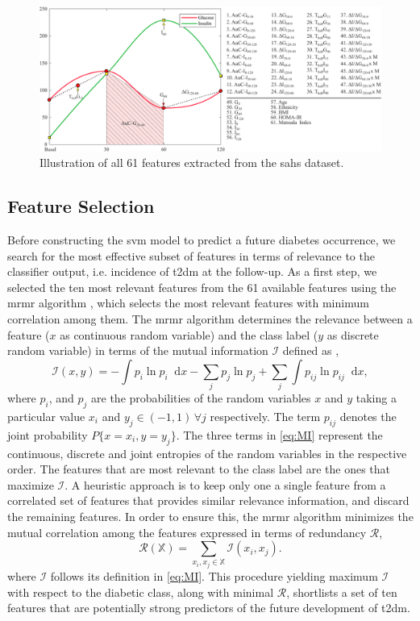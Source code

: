 \documentclass[journal,comsoc]{IEEEtran}
\renewcommand{\^}{\hat}  %
\newcommand*\diff{\mathop{}\!\mathrm{d}} %
\begin{document}
\begin{figure}[t!]
  \centering
  \includegraphics[width=.9\linewidth]{features_define_text.pdf}
  \caption{Illustration of all 61 features extracted from the \ac{sahs} dataset.}
  \label{fig:features}
\end{figure}
%
%
%
%
\subsection{Feature Selection}
%
Before constructing the \ac{svm} model to predict a future diabetes occurrence, we search for the most effective subset of features in terms of relevance to the classifier output, i.e. incidence of \ac{t2dm} at the follow-up. As a first step, we selected the ten most relevant features from the \num{61} available features using the \ac{mrmr} algorithm \cite{mRMR}, which selects the most relevant features with minimum correlation among them. The \ac{mrmr} algorithm determines the relevance between a feature ($x$ as continuous random variable) and the class label ($y$ as discrete random variable) in terms of the mutual information $\mathcal I$ defined as \cite{ross2014mutual},
%
\begin{equation}
  \mathcal I(x, y) = - \int p_i \ln p_i \diff x - \sum \limits_j p_j\ln p_j + \sum_j \int p_{ij}\ln p_{ij} \diff x,
  \label{eq:MI}
\end{equation}
%
where $p_{i}$, and $p_{j}$ are the probabilities of the random variables $x$ and $y$ taking a particular value $x_i$ and $y_j \in (-1,1) \, \forall j$ respectively. The term $p_{ij}$ denotes the joint probability $P\{x= x_i, y=y_j\}$. The three terms in \eqref{eq:MI} represent the continuous, discrete and joint entropies of the random variables in the respective order. The features that are most relevant to the class label are the ones that maximize $\mathcal I$. A heuristic approach is to keep only one a single feature from a correlated set of features that provides similar relevance information, and discard the remaining features. In order to ensure this, the \ac{mrmr} algorithm minimizes the mutual correlation among the features expressed in terms of redundancy $\mathcal R$,
%
\begin{equation}
  \mathcal R(\mathbb X) = \sum \limits_{x_i, x_j \in \mathbb{X}} \mathcal {I}(x_i, x_j).
  \label{eq:R}
\end{equation}
%
where $\mathcal I$ follows its definition in \eqref{eq:MI}. This procedure yielding maximum $\mathcal I$ with respect to the diabetic class, along with minimal $\mathcal R$, shortlists a set of ten features that are potentially strong predictors of the future development of \ac{t2dm}.
%
%
%
%
\end{document}
